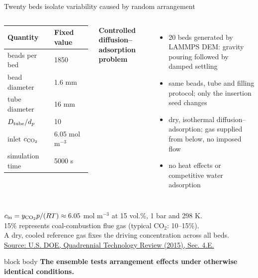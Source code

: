 \documentclass[aspectratio=169,11pt]{beamer}
\newcommand{\hi}[1]{\textcolor{tumblue}{\textbf{#1}}}
\newcommand{\result}[1]{%
  \begin{beamercolorbox}[rounded=true,sep=0.55em]{block body}
  \centering\color{tumdark}\textbf{#1}
  \end{beamercolorbox}}
\begin{document}
\begin{frame}{Twenty beds isolate variability caused by random arrangement}
  \begin{columns}[T,onlytextwidth]
    \small
    \begin{tabular}{ll}\toprule
    Quantity & Fixed value\\\midrule
    beads per bed & 1850\\
    bead diameter & 1.6 mm\\
    tube diameter & 16 mm\\
    $D_{\rm tube}/d_p$ & 10\\
    inlet $c_{\rm CO_2}$ & 6.05 mol m$^{-3}$\\
    simulation time & 5000 s\\\bottomrule
    \end{tabular}
    \small
    \hi{Controlled diffusion--adsorption problem}
    \begin{itemize}\setlength{\itemsep}{2pt}
    \item 20 beds generated by LAMMPS DEM: gravity pouring followed by damped settling
    \item same beads, tube and filling protocol; only the insertion seed changes
    \item dry, isothermal diffusion--adsorption; gas supplied from below, no imposed flow
    \item no heat effects or competitive water adsorption
    \end{itemize}
  \end{columns}
  \vspace{0.20cm}
  {\scriptsize\color{tumgray}
  $c_{\rm in}=y_{\rm CO_2}p/(RT)\approx6.05$ mol m$^{-3}$ at 15 vol.\%, 1 bar and 298 K.\\
  15\% represents coal-combustion flue gas (typical CO$_2$: 10--15\%).\\
  A dry, cooled reference gas fixes the driving concentration across all beds.\\
  \href{https://www.energy.gov/sites/default/files/2016/01/f28/QTR2015-4E-Carbon-Dioxide-Capture-Technologies.pdf}{Source: U.S. DOE, Quadrennial Technology Review (2015), Sec. 4.E.}\par}
  \vspace{0.15cm}
  \result{The ensemble tests arrangement effects under otherwise identical conditions.}
\end{frame}
\end{document}
